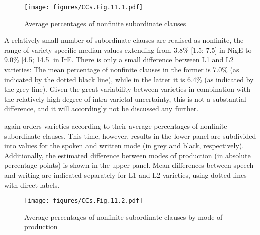\begin{figure}[H]
\texttt{[image: figures/CCs.Fig.11.1.pdf]}
\caption{\label{bkm:Ref75785270}\label{fig:11.1}Average percentages of nonfinite subordinate clauses}
\end{figure}

A relatively small number of subordinate clauses are realised as nonfinite, the range of variety-specific median values extending from 3.8\% [1.5; 7.5] in NigE to 9.0\% [4.5; 14.5] in IrE. There is only a small difference between L1 and L2 varieties: The mean percentage of nonfinite clauses in the former is 7.0\% (as indicated by the dotted black line), while in the latter it is 6.4\% (as indicated by the grey line). Given the great variability between varieties in combination with the relatively high degree of intra-varietal uncertainty, this is not a substantial difference, and it will accordingly not be discussed any further.

 again orders varieties according to their average percentages of nonfinite subordinate clauses. This time, however, results in the lower panel are subdivided into values for the spoken and written mode (in grey and black, respectively). Additionally, the estimated difference between modes of production (in absolute percentage points) is shown in the upper panel. Mean differences between speech and writing are indicated separately for L1 and L2 varieties, using dotted lines with direct labels.

\begin{figure}
\texttt{[image: figures/CCs.Fig.11.2.pdf]}
\caption{\label{bkm:Ref75786254}\label{fig:11.2}Average percentages of nonfinite subordinate clauses by mode of production}
\end{figure}

